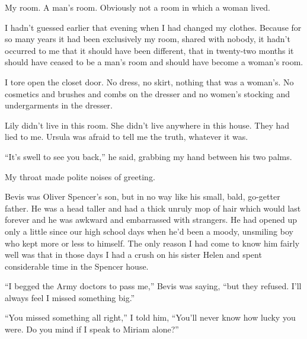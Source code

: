 \documentclass{novel}
\begin{document}
My room. A man’s room. Obviously not a room in which a woman lived.

I hadn’t guessed earlier that evening when I had changed my clothes. Because for so many years it had been exclusively my room, shared with nobody, it hadn’t occurred to me that it should have been different, that in twenty-two months it should have ceased to be a man’s room and should have become a woman’s room.

I tore open the closet door. No dress, no skirt, nothing that was a woman’s. No cosmetics and brushes and combs on the dresser and no women’s stocking and undergarments in the dresser.

Lily didn’t live in this room. She didn’t live anywhere in this house. They had lied to me. Ursula was afraid to tell me the truth, whatever it was.

\vspace{2\nbs}
\clearpage
\thispagestyle{empty}


\begin{ChapterStart}
\vspace{3\nbs}
\end{ChapterStart}

“It’s swell to see you back,” he said, grabbing my hand between his two palms.

My throat made polite noises of greeting.

Bevis was Oliver Spencer’s son, but in no way like his small, bald, go-getter father. He was a head taller and had a thick unruly mop of hair which would last forever and he was awkward and embarrassed with strangers. He had opened up only a little since our high school days when he’d been a moody, unsmiling boy who kept more or less to himself. The only reason I had come to know him fairly well was that in those days I had a crush on his sister Helen and spent considerable time in the Spencer house.

“I begged the Army doctors to pass me,” Bevis was saying, “but they refused. I’ll always feel I missed something big.”

“You missed something all right,” I told him, “You’ll never know how lucky you were. Do you mind if I speak to Miriam alone?”
\end{document}
